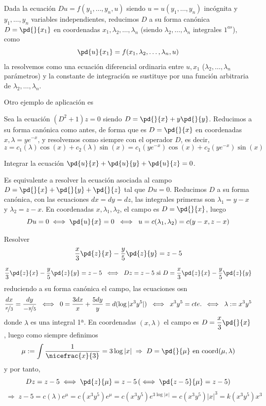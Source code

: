 \begin{prop}
    Dada la ecuación $Du=f(y_1,\ldots,y_n,u)$ siendo $u=u(y_1,\ldots,y_n)$ incógnita y $y_1,\ldots,y_n$ variables independientes, reducimos $D$ a su forma canónica $D=\pd{}{x_1}$ en coordenadas $x_1, \lambda_2, \ldots, \lambda_n$ (siendo $\lambda_2, \ldots, \lambda_n$ integrales $1^{as}$), como
    $$\pd{u}{x_1}=f(x_1,\lambda_2, \ldots, \lambda_n,u)$$
    la resolvemos como una ecuación diferencial ordinaria entre $u,x_1$ ($\lambda_2, \ldots, \lambda_n$ parámetros) y la constante de integración se sustituye por una función arbitraria de $\lambda_2, \ldots, \lambda_n$.
\end{prop}
Otro ejemplo de aplicación es 
\begin{eje} Sea la ecuación $(D^2+1)z=0$ siendo $D=\pd{}{x}+y\pd{}{y}$. Reducimos a su forma canónica como antes, de forma que es $D=\pd{}{x}$ en coordenadas $x,\lambda=ye^{-x}$, y resolvemos como siempre con el operador $D$, es decir, 
$$z=c_1(\lambda) \cos(x) + c_2(\lambda) \sin (x)=c_1(ye^{-x}) \cos(x) + c_2(ye^{-x}) \sin (x)$$
\end{eje}
\begin{ejer} [\textbf{56}]
    Integrar la ecuación $\pd{u}{x}+\pd{u}{y}+\pd{u}{z}=0$. 
\end{ejer}
\begin{sol}
    Es equivalente a resolver la ecuación asociada al campo $D=\pd{}{x}+\pd{}{y}+\pd{}{z}$ tal que $Du=0$. Reducimos $D$ a su forma canónica, con las ecuaciones $dx=dy=dz$, las integrales primeras son $\lambda_1=y-x$ y $\lambda_2=z-x$. En coordenadas $x,\lambda_1,\lambda_2$, el campo es $D=\pd{}{x}$, luego $$Du=0 \iff \pd{u}{x}=0 \; \iff \; u=c(\lambda_1,\lambda_2)=c(y-x,z-x)$$
\end{sol}
\begin{ejer}[\textbf{57}] Resolver
    $$\dfrac{x}{3} \pd{z}{x}-\dfrac{y}{5} \pd{z}{y}=z-5$$
\end{ejer}
\begin{sol}
    $$\dfrac{x}{3} \pd{z}{x}-\dfrac{y}{5} \pd{z}{y}=z-5 \; \iff \; Dz = z-5 \text{ si } D=\dfrac{x}{3} \pd{z}{x}-\dfrac{y}{5} \pd{z}{y}$$
    reduciendo a su forma canónica el campo, las ecuaciones osn 
    $$\dfrac{dx}{\nicefrac{x}{3}}=\dfrac{dy}{-\nicefrac{y}{5}} \; \iff \; 0 = \dfrac{3dx}{x}+\dfrac{5dy}{y}=d(\log|x^3y^5|) \; \iff \; x^3 y^5=cte. \: \iff \; \lambda:= x^3 y^5 $$
    donde $\lambda $ es una integral 1ª. En coordenadas $(x,\lambda)$ el campo es $D=\dfrac{x}{3}\pd{}{x}$, luego como siempre definimos 
    $$\mu:=\int \dfrac{1}{\nicefrac{x}{3}}=3 \log |x| \; \Rightarrow \; D= \pd{}{\mu} \text{ en coord} (\mu, \lambda)$$
    y por tanto, 
    $$Dz=z-5 \iff \pd{z}{\mu}=z-5 \left( \iff \pd{z-5}{\mu}=z-5 \right) $$
    $$\; \Rightarrow \; z-5=c(\lambda) e^{\mu} = c(x^3 y^5) e^{\mu}=c(x^3 y^5) e^{3 \log|x|}=c(x^3 y^5) |x|^3=k(x^3y^5)x^3$$
    \end{sol}
